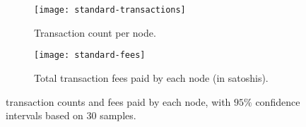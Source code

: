 \begin{figure}[p]
	\centering
	\begin{subfigure}[b]{0.85\textwidth}
		\centering
		\texttt{[image: standard-transactions]}
		\caption{Transaction count per
		node.}\label{subfig:general-transactions}
	\end{subfigure}
	\par\bigskip\medskip
	\begin{subfigure}[b]{0.85\textwidth}
		\centering
		\texttt{[image: standard-fees]}
		\caption{Total transaction fees paid by each node (in
		satoshis).}\label{subfig:general-paid-fees}
	\end{subfigure}
	\caption{transaction counts and fees paid by each node, with \(95\%\)
	confidence intervals based on 30
	samples.}\label{fig:general-transactions-fees}
\end{figure}
